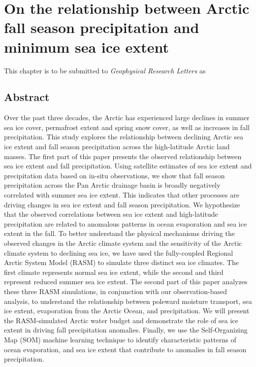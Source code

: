 
\chapter{On the relationship between Arctic fall season precipitation and minimum sea ice extent}
\label{chap:fall_prec}

This chapter is to be submitted to \textit{Geophysical Research Letters} as


\section*{Abstract}

Over the past three decades, the Arctic has experienced large declines in summer sea ice cover, permafrost extent and spring snow cover, as well as increases in fall precipitation.
This study explores the relationship between declining Arctic sea ice extent and fall season precipitation across the high-latitude Arctic land masses.
The first part of this paper presents the observed relationship between sea ice extent and fall precipitation.
Using satellite estimates of sea ice extent and precipitation data based on in-situ observations, we show that fall season precipitation across the Pan Arctic drainage basin is broadly negatively correlated with summer sea ice extent.
This indicates that other processes are driving changes in sea ice extent and fall season precipitation.
We hypothesize that the observed correlations between sea ice extent and high-latitude precipitation are related to anomalous patterns in ocean evaporation and sea ice extent in the fall.
To better understand the physical mechanisms driving the observed changes in the Arctic climate system and the sensitivity of the Arctic climate system to declining sea ice, we have used the fully-coupled Regional Arctic System Model (RASM) to simulate three distinct sea ice climates.
The first climate represents normal sea ice extent, while the second and third represent reduced summer sea ice extent.
The second part of this paper analyzes these three RASM simulations, in conjunction with our observation-based analysis, to understand the relationship between poleward moisture transport, sea ice extent, evaporation from the Arctic Ocean, and precipitation.
We will present the RASM-simulated Arctic water budget and demonstrate the role of sea ice extent in driving fall precipitation anomalies.
Finally, we use the Self-Organizing Map (SOM) machine learning technique to identify characteristic patterns of ocean evaporation, and sea ice extent that contribute to anomalies in fall season precipitation.

